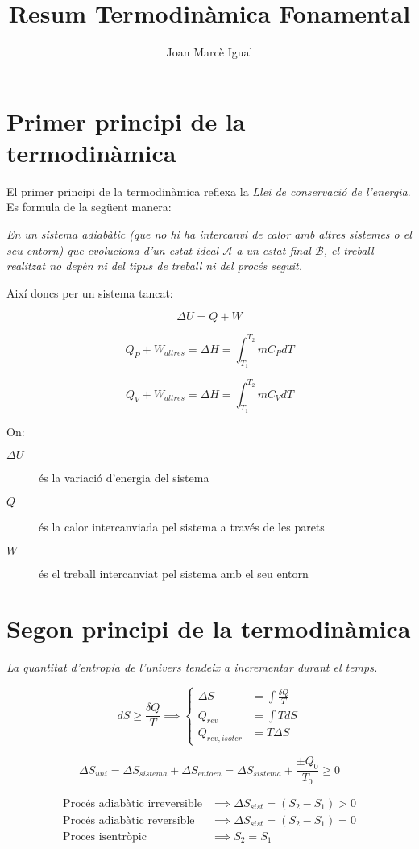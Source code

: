 \documentclass[a4paper]{article}
\title{Resum Termodinàmica Fonamental}
\author{Joan Marcè Igual}
\begin{document}
\maketitle

\section{Primer principi de la termodinàmica}

El primer principi de la termodinàmica reflexa la \emph{Llei de conservació de l'energia}. Es formula de la següent manera:

\begin{displayquote}
	\em
	En un sistema adiabàtic (que no hi ha intercanvi de calor amb altres sistemes o el seu entorn) que evoluciona d'un estat ideal $\mathcal{A}$ a un estat final $\mathcal{B}$, el treball realitzat no depèn ni del tipus de treball ni del procés seguit.
\end{displayquote}

Així doncs per un sistema tancat:

$$
\Delta U = Q + W
$$

$$
Q_P + W_{altres} = \Delta H = \int_{T_1}^{T_2} m C_P dT
$$

$$
Q_V + W_{altres} = \Delta H = \int_{T_1}^{T_2} m C_V dT
$$

On:
\begin{description}
	\item[\boldmath $\Delta U$] és la variació d'energia del sistema
	\item[\boldmath $Q$] és la calor intercanviada pel sistema a través de les parets
	\item[\boldmath $W$] és el treball intercanviat pel sistema amb el seu entorn
\end{description}

\section{Segon principi de la termodinàmica}

\begin{displayquote}
	\em
	La quantitat d'entropia de l'univers tendeix a incrementar durant el temps.
\end{displayquote}

$$
dS \ge \frac{\delta Q}{T} \implies
\begin{cases}
\Delta S &= \int \frac{\delta Q}{T} \\
Q_{rev} &= \int T dS \\
Q_{rev,isoter} &= T \Delta S
\end{cases}
$$

$$
\Delta S_{uni} = \Delta S_{sistema} + \Delta S_{entorn} = \Delta S_{sistema} + \frac{\pm Q_0}{T_0} \ge 0
$$

\begin{align*}
	\text{Procés adiabàtic irreversible} &\implies \Delta S_{sist} = (S_2 - S_1) > 0 \\
	\text{Procés adiabàtic reversible}  &\implies \Delta S_{sist} = (S_2 - S_1) = 0 \\
	\text{Proces isentròpic} &\implies S_2 = S_1
\end{align*}
\end{document}
